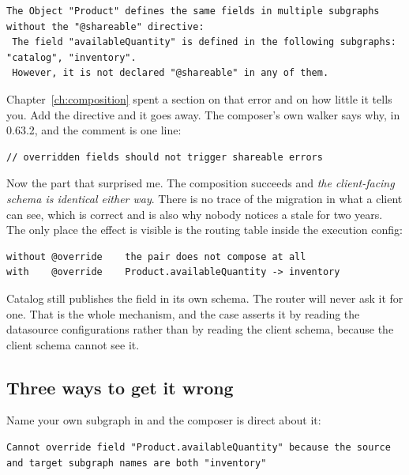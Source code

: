 \begin{verbatim}
The Object "Product" defines the same fields in multiple subgraphs without the "@shareable" directive:
 The field "availableQuantity" is defined in the following subgraphs: "catalog", "inventory".
 However, it is not declared "@shareable" in any of them.
\end{verbatim}

Chapter~\ref{ch:composition} spent a section on that error and on how little it
tells you. Add the directive and it goes away. The composer's own walker says
why, in  0.63.2, and the comment is one line:

\begin{verbatim}
// overridden fields should not trigger shareable errors
\end{verbatim}

%
Now the part that surprised me. The composition succeeds and \emph{the
client-facing schema is identical either way}. There is no trace of the
migration in what a client can see, which is correct and is also why nobody
notices a stale  for two years. The only place the effect is
visible is the routing table inside the execution config:

\begin{verbatim}
without @override    the pair does not compose at all
with    @override    Product.availableQuantity -> inventory
\end{verbatim}

Catalog still publishes the field in its own schema. The router will never ask
it for one. That is the whole mechanism, and the case asserts it by reading the
datasource configurations rather than by reading the client schema, because the
client schema cannot see it.

\subsection*{Three ways to get it wrong}

%
Name your own subgraph in  and the composer is direct about it:

\begin{verbatim}
Cannot override field "Product.availableQuantity" because the source and target subgraph names are both "inventory"
\end{verbatim}

